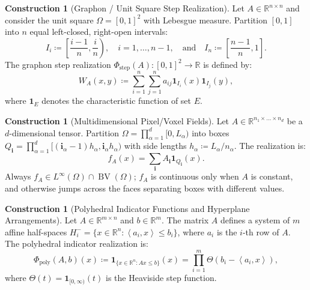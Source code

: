 \documentclass[11pt,a4paper,reqno]{amsart}
\theoremstyle{definition}
\newtheorem{construction}[theorem]{Construction}
\numberwithin{equation}{section}
\newcommand{\R}{\mathbb{R}}
\newcommand{\BV}{\operatorname{BV}}
\newcommand{\inner}[2]{\left\langle #1, #2 \right\rangle}
\begin{document}
\begin{construction}[Graphon / Unit Square Step Realization]
Let $A \in \R^{n \times n}$ and consider the unit square $\Omega = [0, 1]^2$ with Lebesgue measure. Partition $[0, 1]$ into $n$ equal left-closed, right-open intervals:
\begin{equation}
    I_i \coloneqq \left[\frac{i-1}{n}, \frac{i}{n}\right), \quad i=1, \dots, n-1, \quad \text{and} \quad I_n \coloneqq \left[\frac{n-1}{n}, 1\right].
\end{equation}
The graphon step realization $\Phi_{\mathrm{step}}(A) \colon [0, 1]^2 \to \R$ is defined by:
\begin{equation}
    \label{eq:graphon_step}
    W_A(x, y) \coloneqq \sum_{i=1}^n \sum_{j=1}^n a_{ij} \mathbf{1}_{I_i}(x) \mathbf{1}_{I_j}(y),
\end{equation}
where $\mathbf{1}_E$ denotes the characteristic function of set $E$.
\end{construction}

\begin{construction}[Multidimensional Pixel/Voxel Fields]
Let $A \in \R^{n_1 \times \dots \times n_d}$ be a $d$-dimensional tensor. Partition $\Omega = \prod_{\alpha=1}^d [0, L_\alpha)$ into boxes $Q_{\mathbf{i}} = \prod_{\alpha=1}^d [(\mathbf{i}_\alpha-1) h_\alpha, \mathbf{i}_\alpha h_\alpha)$ with side lengths $h_\alpha \coloneqq L_\alpha / n_\alpha$. The realization is:
\begin{equation}
    f_A(x) = \sum_{\mathbf{i}} A_{\mathbf{i}} \mathbf{1}_{Q_{\mathbf{i}}}(x).
\end{equation}
Always $f_A \in L^\infty(\Omega) \cap \BV(\Omega)$; $f_A$ is continuous only when $A$ is constant, and otherwise jumps across the faces separating boxes with different values.
\end{construction}

\begin{construction}[Polyhedral Indicator Functions and Hyperplane Arrangements]
Let $A \in \R^{m \times n}$ and $b \in \R^m$. The matrix $A$ defines a system of $m$ affine half-spaces $H_i^- = \{x \in \R^n \colon \inner{a_i}{x} \le b_i\}$, where $a_i$ is the $i$-th row of $A$. The polyhedral indicator realization is:
\begin{equation}
    \Phi_{\mathrm{poly}}(A, b)(x) \coloneqq \mathbf{1}_{\{x \in \R^n \colon Ax \le b\}}(x) = \prod_{i=1}^m \Theta(b_i - \inner{a_i}{x}),
\end{equation}
where $\Theta(t) = \mathbf{1}_{[0, \infty)}(t)$ is the Heaviside step function.
\end{construction}
\end{document}

